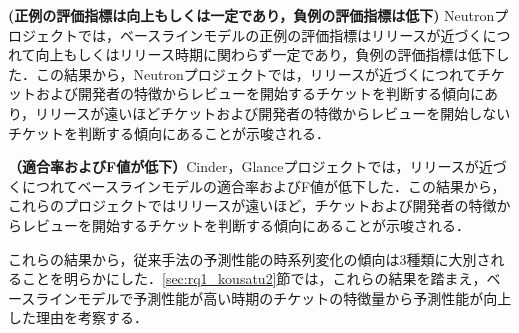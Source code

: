 \documentclass[submit]{ipsj}
\begin{document}
\textbf{ (正例の評価指標は向上もしくは一定であり，負例の評価指標は低下) }Neutronプロジェクトでは，ベースラインモデルの正例の評価指標はリリースが近づくにつれて向上もしくはリリース時期に関わらず一定であり，負例の評価指標は低下した．この結果から，Neutronプロジェクトでは，リリースが近づくにつれてチケットおよび開発者の特徴からレビューを開始するチケットを判断する傾向にあり，リリースが遠いほどチケットおよび開発者の特徴からレビューを開始しないチケットを判断する傾向にあることが示唆される．

\textbf{（適合率およびF値が低下）}Cinder，Glanceプロジェクトでは，リリースが近づくにつれてベースラインモデルの適合率およびF値が低下した．この結果から，これらのプロジェクトではリリースが遠いほど，チケットおよび開発者の特徴からレビューを開始するチケットを判断する傾向にあることが示唆される．

これらの結果から，従来手法の予測性能の時系列変化の傾向は3種類に大別されることを明らかにした．\ref{sec:rq1_kousatu2}節では，これらの結果を踏まえ，ベースラインモデルで予測性能が高い時期のチケットの特徴量から予測性能が向上した理由を考察する．


\begin{table}[t]
\caption{各プロジェクトのレビュー予測モデルにおける評価指標の回帰係数の分類}
\label{table:review_seino_jikeiretsu}
\centering
\vspace{0.5zh}
\end{table}
\end{document}
